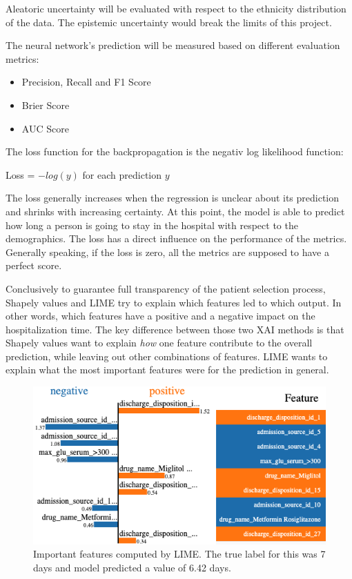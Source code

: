 \documentclass[journal]{IEEEtran}
\begin{document}
Aleatoric uncertainty will be evaluated with respect to the ethnicity distribution of the data. The epistemic uncertainty would break the limits of this project.

The neural network's prediction will be measured based on different evaluation metrics: \\

\begin{itemize}
	\item Precision, Recall and F1 Score
	\item Brier Score
	\item AUC Score \\
\end{itemize}

The loss function for the backpropagation is the negativ log likelihood function: 

\begin{center}
	Loss = \(-log(y)\) for each prediction \(y\) \\
\end{center}

The loss generally increases when the regression is unclear about its prediction and shrinks with increasing certainty. At this point, the model is able to predict how long a person is going to stay in the hospital with respect to the demographics. The loss has a direct influence on the performance of the metrics. Generally speaking, if the loss is zero, all the metrics are supposed to have a perfect score.

Conclusively to guarantee full transparency of the patient selection process, Shapely values and LIME try to explain which features led to which output. In other words, which features have a positive and a negative impact on the hospitalization time. The key difference between those two XAI methods is that Shapely values want to explain \textit{how} one feature contribute to the overall prediction, while leaving out other combinations of features. LIME wants to explain what the most important features were for the prediction in general.

\begin{figure}[!b]
	\centering
	\includegraphics[width=1\linewidth]{../imgs/lime_paper}
	\caption{Important features computed by LIME. The true label for this was 7 days and model predicted a value of 6.42 days.}
	\label{fig:lime}
\end{figure}
\end{document}
